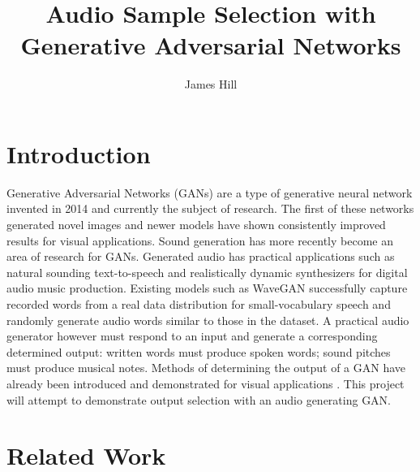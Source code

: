 \documentclass[a4paper, dvipsnames, titlepage]{article}
\title{Audio Sample Selection with Generative Adversarial Networks}
\author{James Hill}
\date{}
\begin{document}
\maketitle
\tableofcontents

\newpage

\section{Introduction}

Generative Adversarial Networks (GANs) \cite{2014arXiv1406.2661G} are a type of generative neural network invented in 2014 and currently the subject of research.
The first of these networks generated novel images and newer models have shown consistently improved results for visual applications.
\newline
\newline
Sound generation has more recently become an area of research for GANs.
Generated audio has practical applications such as natural sounding text-to-speech and realistically dynamic synthesizers for digital audio music production.
Existing models such as WaveGAN \cite{2018arXiv180204208D} successfully capture recorded words from a real data distribution for small-vocabulary speech and randomly generate audio words similar to those in the dataset.
\newline
\newline
A practical audio generator however must respond to an input and generate a corresponding determined output: written words must produce spoken words; sound pitches must produce musical notes.
Methods of determining the output of a GAN have already been introduced and demonstrated for visual applications \cite{2014arXiv1411.1784M}.
This project will attempt to demonstrate output selection with an audio generating GAN.

\newpage

\section{Related Work}
\end{document}
